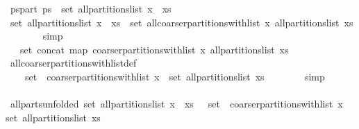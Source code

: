 \begin{isabellebody}
\ ps{\isacharunderscore}part{\isacharcolon}\ {\isachardoublequoteopen}ps\ {\isasymin}\ set\ {\isacharparenleft}all{\isacharunderscore}partitions{\isacharunderscore}list\ {\isacharparenleft}x\ {\isacharhash}\ xs{\isacharparenright}{\isacharparenright}{\isachardoublequoteclose}\isanewline
\isanewline
\ \ \ \ \isamarkupfalse%
\ {\isachardoublequoteopen}set\ {\isacharparenleft}all{\isacharunderscore}partitions{\isacharunderscore}list\ {\isacharparenleft}x\ {\isacharhash}\ xs{\isacharparenright}{\isacharparenright}\ {\isacharequal}\ set\ {\isacharparenleft}all{\isacharunderscore}coarser{\isacharunderscore}partitions{\isacharunderscore}with{\isacharunderscore}list\ x\ {\isacharparenleft}all{\isacharunderscore}partitions{\isacharunderscore}list\ xs{\isacharparenright}{\isacharparenright}{\isachardoublequoteclose}\isanewline
\ \ \ \ \ \ \isamarkupfalse%
\ simp\isanewline
\ \ \ \ \isamarkupfalse%
\ \isamarkupfalse%
\ {\isachardoublequoteopen}{\isasymdots}\ {\isacharequal}\ set\ {\isacharparenleft}concat\ {\isacharparenleft}map\ {\isacharparenleft}coarser{\isacharunderscore}partitions{\isacharunderscore}with{\isacharunderscore}list\ x{\isacharparenright}\ {\isacharparenleft}all{\isacharunderscore}partitions{\isacharunderscore}list\ xs{\isacharparenright}{\isacharparenright}{\isacharparenright}{\isachardoublequoteclose}\isanewline
\ \ \ \ \ \ \isamarkupfalse%
\ all{\isacharunderscore}coarser{\isacharunderscore}partitions{\isacharunderscore}with{\isacharunderscore}list{\isacharunderscore}def\ \isacommand{{\isachardot}{\isachardot}}\isamarkupfalse%
\isanewline
\ \ \ \ \isamarkupfalse%
\ \isamarkupfalse%
\ {\isachardoublequoteopen}{\isasymdots}\ {\isacharequal}\ {\isasymUnion}\ {\isacharparenleft}{\isacharparenleft}set\ {\isasymcirc}\ {\isacharparenleft}coarser{\isacharunderscore}partitions{\isacharunderscore}with{\isacharunderscore}list\ x{\isacharparenright}{\isacharparenright}\ {\isacharbackquote}\ {\isacharparenleft}set\ {\isacharparenleft}all{\isacharunderscore}partitions{\isacharunderscore}list\ xs{\isacharparenright}{\isacharparenright}{\isacharparenright}{\isachardoublequoteclose}\isanewline
\ \ \ \ \ \ \isamarkupfalse%
\ simp\isanewline
\ \ \ \ \isamarkupfalse%
\ \isamarkupfalse%
\ all{\isacharunderscore}parts{\isacharunderscore}unfolded{\isacharcolon}\ {\isachardoublequoteopen}set\ {\isacharparenleft}all{\isacharunderscore}partitions{\isacharunderscore}list\ {\isacharparenleft}x\ {\isacharhash}\ xs{\isacharparenright}{\isacharparenright}\ {\isacharequal}\ {\isasymUnion}\ {\isacharparenleft}{\isacharparenleft}set\ {\isasymcirc}\ {\isacharparenleft}coarser{\isacharunderscore}partitions{\isacharunderscore}with{\isacharunderscore}list\ x{\isacharparenright}{\isacharparenright}\ {\isacharbackquote}\ {\isacharparenleft}set\ {\isacharparenleft}all{\isacharunderscore}partitions{\isacharunderscore}list\ xs{\isacharparenright}{\isacharparenright}{\isacharparenright}{\isachardoublequoteclose}\ \isacommand{{\isachardot}}\isamarkupfalse%

\end{isabellebody}
